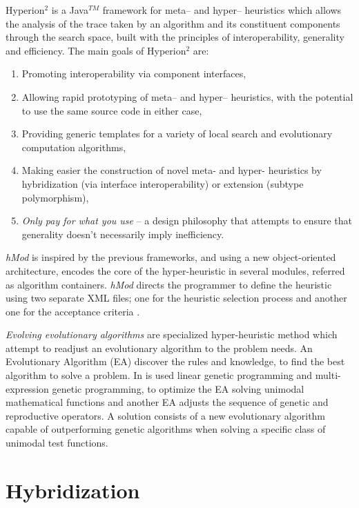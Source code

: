 {\sc Hyperion}$^2$ \cite{Brownlee2014} is a Java$^{TM}$ framework for meta-- and hyper-- heuristics which allows the analysis of the trace taken by an algorithm and its constituent components through the search space, built with the principles of interoperability, generality and efficiency. The main goals of {\sc Hyperion}$^2$ are:
\begin{enumerate} %
\item Promoting interoperability via component interfaces,
\item Allowing rapid prototyping of meta-- and hyper-- heuristics, with the potential to use the same source code in either case,
\item Providing generic templates for a variety of local search and evolutionary computation algorithms,
\item Making easier the construction of novel meta- and hyper- heuristics by hybridization (via interface interoperability) or extension (subtype polymorphism),
\item {\it Only pay for what you use} -- a design philosophy that attempts to ensure that generality doesn't necessarily imply inefficiency.
\end{enumerate}%

\textit{hMod} is inspired by the previous frameworks, and using a new object-oriented architecture, encodes the core of the hyper-heuristic in several modules, referred as algorithm containers. \textit{hMod} directs the programmer to define the heuristic using two separate XML files; one for the heuristic selection process and another one for the acceptance criteria \cite{Urra2013}.

\textit{Evolving evolutionary algorithms} are specialized hyper-heuristic method which attempt to readjust an evolutionary algorithm to the problem needs. An Evolutionary Algorithm (EA) discover the rules and knowledge, to find the best algorithm to solve a problem. In \cite{Diosan2009} is used linear genetic programming and multi-expression genetic programming, to optimize the EA solving unimodal mathematical functions and another EA adjusts the sequence of genetic and reproductive operators. A solution consists of a new evolutionary algorithm capable of outperforming genetic algorithms when solving a specific class of unimodal test functions. 

\section{Hybridization}
\label{sec:hybrid}


